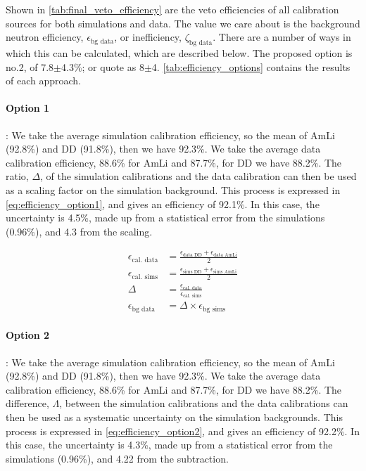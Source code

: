 Shown in \autoref{tab:final_veto_efficiency} are the veto efficiencies of all calibration sources for both simulations and data.
The value we care about is the background neutron efficiency, $\epsilon_{\textrm{bg data}}$, or inefficiency, $\zeta_{\textrm{bg data}}$.
There are a number of ways in which this can be calculated, which are described below.
The proposed option is no.2, of 7.8$\pm$4.3\%; or quote as 8$\pm$4.
\autoref{tab:efficiency_options} contains the results of each approach.

\paragraph{Option 1}:
We take the average simulation calibration efficiency, so the mean of AmLi (92.8\%) and DD (91.8\%), then we have 92.3\%.
We take the average data calibration efficiency, 88.6\% for AmLi and 87.7\%, for DD we have 88.2\%.
The ratio, $\Delta$, of the simulation calibrations and the data calibration can then be used as a scaling factor on the simulation background.
This process is expressed in \autoref{eq:efficiency_option1}, and gives an efficiency of 92.1\%.
In this case, the uncertainty is 4.5\%, made up from a statistical error from the simulations (0.96\%), and 4.3 from the scaling.

\begin{align}
    \epsilon_{\textrm{cal. data}} &= \frac{\epsilon_{\textrm{data DD}} + \epsilon_{\textrm{data AmLi}}}{2} \\
    \epsilon_{\textrm{cal. sims}} &= \frac{\epsilon_{\textrm{sims DD}} + \epsilon_{\textrm{sims AmLi}}}{2} \\
    \Delta &= \frac{\epsilon_{\textrm{cal. data}}}{\epsilon_{\textrm{cal. sims}}} \\
    \epsilon_{\textrm{bg data}} &= \Delta \times \epsilon_{\textrm{bg sims}}
    \label{eq:efficiency_option1}
\end{align}

\paragraph{Option 2}:
We take the average simulation calibration efficiency, so the mean of AmLi (92.8\%) and DD (91.8\%), then we have 92.3\%.
We take the average data calibration efficiency, 88.6\% for AmLi and 87.7\%, for DD we have 88.2\%.
The difference, $\Lambda$, between the simulation calibrations and the data calibrations can then be used as a systematic uncertainty on the simulation backgrounds.
This process is expressed in \autoref{eq:efficiency_option2}, and gives an efficiency of 92.2\%.
In this case, the uncertainty is 4.3\%, made up from a statistical error from the simulations (0.96\%), and 4.22 from the subtraction.

